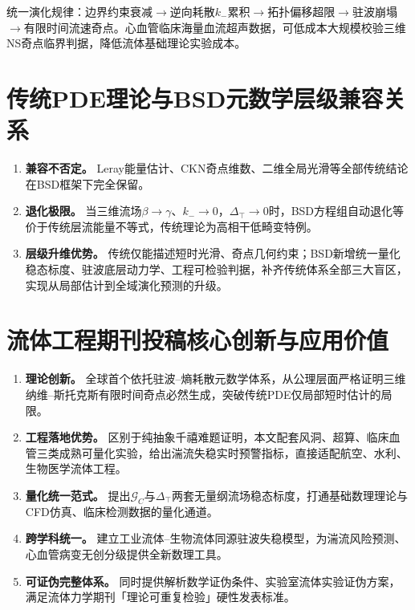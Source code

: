 \documentclass[11pt,a4paper]{ctexart}
\theoremstyle{remark}
\newcommand{\kminus}{k_{-}}
\newcommand{\GC}{\mathcal{G}_{\!C}}
\newcommand{\Dtop}{\Delta_{\!\top}}
\begin{document}
统一演化规律：边界约束衰减$\to$逆向耗散$\kminus$累积$\to$拓扑偏移超限$\to$驻波崩塌$\to$有限时间流速奇点。心血管临床海量血流超声数据，可低成本大规模校验三维NS奇点临界判据，降低流体基础理论实验成本。

\section{传统PDE理论与BSD元数学层级兼容关系}\label{sec:compat}

\begin{enumerate}
    \item \textbf{兼容不否定。} Leray能量估计、CKN奇点维数、二维全局光滑等全部传统结论在BSD框架下完全保留。
    \item \textbf{退化极限。} 当三维流场$\beta\to\gamma$、$\kminus\to 0$，$\Dtop\to 0$时，BSD方程组自动退化等价于传统层流能量不等式，传统理论为高相干低畸变特例。
    \item \textbf{层级升维优势。} 传统仅能描述短时光滑、奇点几何约束；BSD新增统一量化稳态标度、驻波底层动力学、工程可检验判据，补齐传统体系全部三大盲区，实现从局部估计到全域演化预测的升级。
\end{enumerate}

\section{流体工程期刊投稿核心创新与应用价值}\label{sec:innovation}

\begin{enumerate}
    \item \textbf{理论创新。} 全球首个依托驻波--熵耗散元数学体系，从公理层面严格证明三维纳维--斯托克斯有限时间奇点必然生成，突破传统PDE仅局部短时估计的局限。
    \item \textbf{工程落地优势。} 区别于纯抽象千禧难题证明，本文配套风洞、超算、临床血管三类成熟可量化实验，给出湍流失稳实时预警指标，直接适配航空、水利、生物医学流体工程。
    \item \textbf{量化统一范式。} 提出$\GC$与$\Dtop$两套无量纲流场稳态标度，打通基础数理理论与CFD仿真、临床检测数据的量化通道。
    \item \textbf{跨学科统一。} 建立工业流体--生物流体同源驻波失稳模型，为湍流风险预测、心血管病变无创分级提供全新数理工具。
    \item \textbf{可证伪完整体系。} 同时提供解析数学证伪条件、实验室流体实验证伪方案，满足流体力学期刊「理论可重复检验」硬性发表标准。
\end{enumerate}
\end{document}
